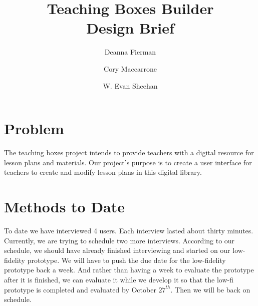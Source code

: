 \documentclass[11pt,letter]{article}
\title{Teaching Boxes Builder \\ Design Brief}
\author{Deanna Fierman \and Cory Maccarrone \and W. Evan Sheehan}
\begin{document}
\begin{titlepage}
	\maketitle
	\thispagestyle{empty}
\end{titlepage}

\hfill
\thispagestyle{empty}
\pagebreak
\setcounter{page}{0}

\section{Problem}
The teaching boxes project intends to provide teachers with a digital resource
for lesson plans and materials. Our project's purpose is to create a user
interface for teachers to create and modify lesson plans in this digital
library.

\section{Methods to Date}
To date we have interviewed 4 users. Each interview lasted about thirty minutes.
Currently, we are trying to schedule two more interviews. According to our
schedule, we should have already finished interviewing and started on our
low-fidelity prototype. We will have to push the due date for the low-fidelity
prototype back a week. And rather than having a week to evaluate the prototype
after it is finished, we can evaluate it while we develop it so that the low-fi
prototype is completed and evaluated by October $27^{th}$. Then we will be back
on schedule.
\end{document}
